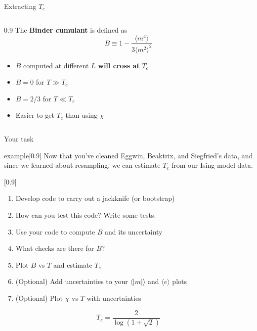 

\begin{frame}{Extracting $T_c$}
    \begin{columns}
        \begin{column}{0.9\textwidth}
            The \textbf{Binder cumulant} is defined as
            $$
            B\equiv1-\frac{\langle m^4\rangle}{3\langle m^2\rangle^2}
            $$
            \begin{itemize}
            \item $B$ computed at different $L$ \textbf{will cross at} $T_c$
            \item $B=0$ for $T\gg T_c$
            \item $B=2/3$ for $T\ll T_c$
            \item Easier to get $T_c$ than using $\chi$
            \end{itemize}
        \end{column}
    \end{columns}
\end{frame}

\begin{frame}{Your task}
    \begin{varblock}{example}[0.9\textwidth]{}
        \small
        Now that you've cleaned Eggwin, Beaktrix, and Siegfried's data, and since we
        learned about resampling, we can estimate $T_c$ from our Ising model data.
    \end{varblock}
    \vspace{-1mm}
    \begin{varblock}{}[0.9\textwidth]{}
        \begin{enumerate}
            \setlength{\itemsep}{0pt}
            \item Develop code to carry out a jackknife (or bootstrap)
            \item How can you test this code? Write some tests.
            \item Use your code to compute $B$ and its uncertainty
            \item What checks are there for $B$?
            \item Plot $B$ vs $T$ and estimate $T_c$
            \item (Optional) Add uncertainties to your $\langle|m|\rangle$
            and $\langle e\rangle$ plots
            \item (Optional) Plot $\chi$ vs $T$ with uncertainties
        \end{enumerate}
    \end{varblock}
    \vspace{-3mm}
    \small
    $$
    T_c=\frac{2}{\log\left(1+\sqrt{2}\right)}
    $$
\end{frame}

